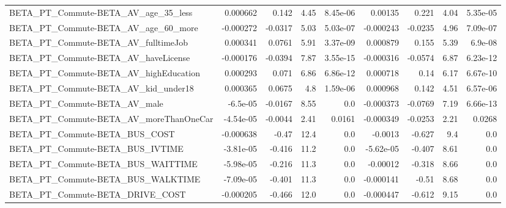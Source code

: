 \begin{tabular}{lrrrrrrrr}
BETA\_PT\_Commute-BETA\_AV\_age\_35\_less                &    0.000662 &        0.142 &      4.45 & 8.45e-06 &    0.00135 &       0.221 &         4.04 &      5.35e-05 \\
BETA\_PT\_Commute-BETA\_AV\_age\_60\_more                &   -0.000272 &      -0.0317 &      5.03 & 5.03e-07 &  -0.000243 &     -0.0235 &         4.96 &      7.09e-07 \\
BETA\_PT\_Commute-BETA\_AV\_fulltimeJob                &    0.000341 &       0.0761 &      5.91 & 3.37e-09 &   0.000879 &       0.155 &         5.39 &       6.9e-08 \\
BETA\_PT\_Commute-BETA\_AV\_haveLicense                &   -0.000176 &      -0.0394 &      7.87 & 3.55e-15 &  -0.000316 &     -0.0574 &         6.87 &      6.23e-12 \\
BETA\_PT\_Commute-BETA\_AV\_highEducation              &    0.000293 &        0.071 &      6.86 & 6.86e-12 &   0.000718 &        0.14 &         6.17 &      6.67e-10 \\
BETA\_PT\_Commute-BETA\_AV\_kid\_under18                &    0.000365 &       0.0675 &       4.8 & 1.59e-06 &   0.000968 &       0.142 &         4.51 &      6.57e-06 \\
BETA\_PT\_Commute-BETA\_AV\_male                       &    -6.5e-05 &      -0.0167 &      8.55 &      0.0 &  -0.000373 &     -0.0769 &         7.19 &      6.66e-13 \\
BETA\_PT\_Commute-BETA\_AV\_moreThanOneCar             &   -4.54e-05 &      -0.0044 &      2.41 &   0.0161 &  -0.000349 &     -0.0253 &         2.21 &        0.0268 \\
BETA\_PT\_Commute-BETA\_BUS\_COST                      &   -0.000638 &        -0.47 &      12.4 &      0.0 &    -0.0013 &      -0.627 &          9.4 &           0.0 \\
BETA\_PT\_Commute-BETA\_BUS\_IVTIME                    &   -3.81e-05 &       -0.416 &      11.2 &      0.0 &  -5.62e-05 &      -0.407 &         8.61 &           0.0 \\
BETA\_PT\_Commute-BETA\_BUS\_WAITTIME                  &   -5.98e-05 &       -0.216 &      11.3 &      0.0 &   -0.00012 &      -0.318 &         8.66 &           0.0 \\
BETA\_PT\_Commute-BETA\_BUS\_WALKTIME                  &   -7.09e-05 &       -0.401 &      11.3 &      0.0 &  -0.000141 &       -0.51 &         8.68 &           0.0 \\
BETA\_PT\_Commute-BETA\_DRIVE\_COST                    &   -0.000205 &       -0.466 &      12.0 &      0.0 &  -0.000447 &      -0.612 &         9.15 &           0.0 \\

\end{tabular}

